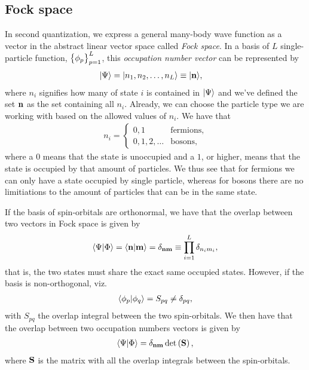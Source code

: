         \subsection{Fock space}
            In second quantization, we express a general many-body wave function
            as a vector in the abstract linear vector space called \emph{Fock
            space}.
            In a basis of $L$ single-particle function, $\left\{ \phi_p \right\}_{p =
            1}^{L}$, this \emph{occupation number vector} can be represented by
            \begin{align}
                | \Psi \rangle
                &= | n_1, n_2, \dots, n_L \rangle
                \equiv | \mathbf{n} \rangle,
            \end{align}
            where $n_i$ signifies how many of state $i$ is contained in
            $| \Psi \rangle$ and we've defined the set $\mathbf{n}$ as the set
            containing all $n_i$.
            Already, we can choose the particle type we are working with based
            on the allowed values of $n_i$.
            We have that
            \begin{align}
                n_i =
                \begin{cases}
                    0, 1 & \text{fermions}, \\
                    0, 1, 2, \dots & \text{bosons},
                \end{cases}
            \end{align}
            where a $0$ means that the state is unoccupied and a $1$, or higher,
            means that the state is occupied by that amount of particles.
            We thus see that for fermions we can only have a state occupied by
            single particle, whereas for bosons there are no limitiations to the
            amount of particles that can be in the same state.

            If the basis of spin-orbitals are orthonormal, we have that the
            overlap between two vectors in Fock space is given by
            \begin{align}
                \langle \Psi | \Phi \rangle
                = \langle \mathbf{n} | \mathbf{m} \rangle
                = \delta_{\mathbf{n}\mathbf{m}}
                \equiv \prod_{i = 1}^{L} \delta_{n_i m_i},
            \end{align}
            that is, the two states must share the exact same occupied states.
            However, if the basis is non-orthogonal, viz.
            \begin{align}
                \langle \phi_p | \phi_q \rangle = S_{pq} \neq \delta_{pq},
            \end{align}
            with $S_{pq}$ the overlap integral between the two spin-orbitals.
            We then have that the overlap between two occupation numbers vectors
            is given by
            \begin{align}
                \langle \Psi | \Phi \rangle
                = \delta_{\mathbf{n}\mathbf{m}}\det\left( \mathbf{S} \right),
            \end{align}
            where $\mathbf{S}$ is the matrix with all the overlap integrals between
            the spin-orbitals.

